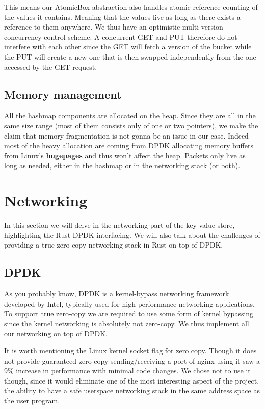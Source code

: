 \documentclass[11pt]{article}
\begin{document}
This means our AtomicBox abstraction also handles atomic reference
counting of the values it contains. Meaning that the values live as
long as there exists a reference to them anywhere. We thus have an
optimistic multi-version concurrency control scheme. A concurrent GET
and PUT therefore do not interfere with each other since the GET will
fetch a version of the bucket while the PUT will create a new one that
is then swapped independently from the one accessed by the GET
request.

\subsection{Memory management}
All the hashmap components are allocated on the heap. Since they are
all in the same size range (most of them consists only of one or two
pointers), we make the claim that memory fragmentation is not gonna be
an issue in our case. Indeed most of the heavy allocation are coming
from DPDK allocating memory buffers from Linux's \textbf{hugepages}
and thus won't affect the heap. Packets only live as long as needed,
either in the hashmap or in the networking stack (or both).

\section{Networking}

In this section we will delve in the networking part of the key-value
store, highlighting the Rust-DPDK interfacing. We will also talk about
the challenges of providing a true zero-copy networking stack in Rust
on top of DPDK.

\subsection{DPDK}

As you probably know, DPDK is a kernel-bypass networking framework
developed by Intel, typically used for high-performance networking
applications. To support true zero-copy we are required to use some
form of kernel bypassing since the kernel networking is absolutely
not zero-copy. We thus implement all our networking on top of DPDK.

It is worth mentioning the Linux kernel socket flag for zero copy.
Though it does not provide guaranteed zero copy sending/receiving a
port of nginx using it saw a 9\% increase in performance with minimal
code changes. We chose not to use it though, since it would eliminate
one of the most interesting aspect of the project, the ability to have
a safe userspace networking stack in the same address space as the
user program.
\end{document}
